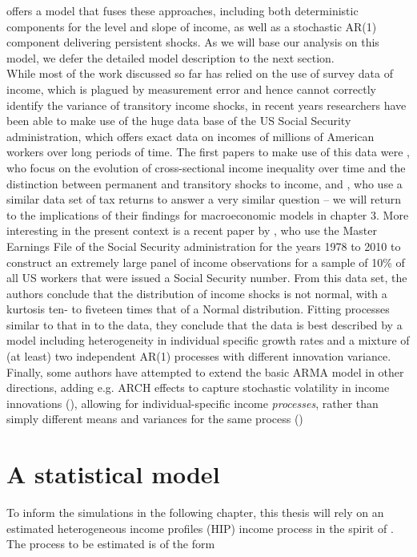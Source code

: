 offers a model that fuses these approaches, including both deterministic 
components for the level and slope of income, as well as a stochastic AR(1)
component delivering persistent shocks. As we will base our analysis on this 
model, we defer the detailed model description to the next section. \\
While most of the work discussed so far has relied on the use of survey data of
income, which is plagued by measurement error and hence cannot correctly identify
the variance of transitory income shocks, in recent years researchers have been 
able to make use of the huge data base of the US Social Security administration,
which offers exact data on incomes of millions of American workers over long 
periods of time. The first papers to make use of this data were \citet{KopczukSaezSong2010},
who focus on the evolution of cross-sectional income inequality over time and
the distinction between permanent and transitory shocks to income, and 
\citet{DHPRV2013}, who use a similar data set of tax returns to answer a very 
similar question -- we will return to the implications of their findings for 
macroeconomic models in chapter 3. More interesting in the present context is
a recent paper by \citet{GKOS2015}, who use the Master Earnings
File of the Social Security administration for the years 1978 to 2010 to 
construct an extremely large panel of income observations for a sample of 10\%
of all US workers that were issued a Social Security number. From this data set,
the authors conclude that the distribution of income shocks is not normal, with
a kurtosis ten- to fiveteen times that of a Normal distribution. Fitting processes
similar to that in \citet{Guvenen2009} to the data, they conclude that the data
is best described by a model including heterogeneity in individual specific 
growth rates and a mixture of (at least) two independent AR(1) processes with 
different innovation variance. 
Finally, some authors have attempted to extend the basic ARMA model in other 
directions, adding e.g. ARCH effects to capture stochastic volatility in income
innovations (\citealt{MeghirPistaferri2004}), allowing for individual-specific
income \textit{processes}, rather than simply different means and variances for 
the same process (\citealt{BrowningEjrnaesAlvarez2010})

\section{A statistical model}
To inform the simulations in the following chapter, this thesis will rely on an
estimated heterogeneous income profiles (HIP) income process in the spirit of
\citet{Guvenen2009}. The process to be estimated is of the form

